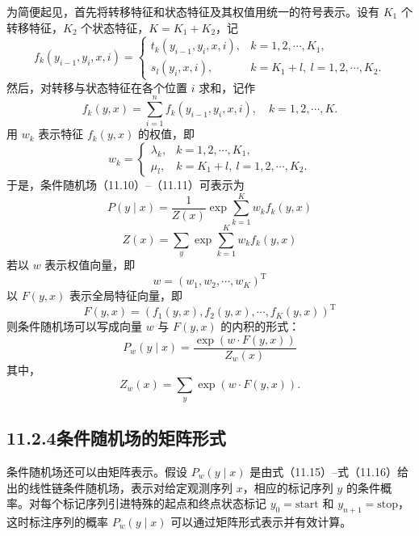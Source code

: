 \documentclass[UTF8, 12pt, fontset=fandol, oneside]{ctexart}
\begin{document}
为简便起见，首先将转移特征和状态特征及其权值用统一的符号表示。设有 $K_1$ 个转移特征，$K_2$ 个状态特征，$K=K_1+K_2$，记
\begin{equation}
f_k(y_{i-1},y_i,x,i)=
\begin{cases}
t_k(y_{i-1},y_i,x,i), & k=1,2,\cdots,K_1,\\
s_l(y_i,x,i), & k=K_1+l,\ l=1,2,\cdots,K_2.
\end{cases}
\tag{11.12}
\end{equation}
然后，对转移与状态特征在各个位置 $i$ 求和，记作
\begin{equation}
f_k(y,x)=\sum_{i=1}^{n}f_k(y_{i-1},y_i,x,i),\quad k=1,2,\cdots,K.
\tag{11.13}
\end{equation}
用 $w_k$ 表示特征 $f_k(y,x)$ 的权值，即
\begin{equation}
w_k=
\begin{cases}
\lambda_k, & k=1,2,\cdots,K_1,\\
\mu_l, & k=K_1+l,\ l=1,2,\cdots,K_2.
\end{cases}
\tag{11.14}
\end{equation}
于是，条件随机场（11.10）--（11.11）可表示为
\begin{equation}
P(y\mid x)=\frac{1}{Z(x)}\exp\sum_{k=1}^{K}w_k f_k(y,x)
\tag{11.15}
\end{equation}
\begin{equation}
Z(x)=\sum_y\exp\sum_{k=1}^{K}w_k f_k(y,x)
\tag{11.16}
\end{equation}
若以 $w$ 表示权值向量，即
\begin{equation}
w=(w_1,w_2,\cdots,w_K)^{\mathrm T}
\tag{11.17}
\end{equation}
以 $F(y,x)$ 表示全局特征向量，即
\begin{equation}
F(y,x)=(f_1(y,x),f_2(y,x),\cdots,f_K(y,x))^{\mathrm T}
\tag{11.18}
\end{equation}
则条件随机场可以写成向量 $w$ 与 $F(y,x)$ 的内积的形式：
\begin{equation}
P_w(y\mid x)=\frac{\exp(w\cdot F(y,x))}{Z_w(x)}
\tag{11.19}
\end{equation}
其中，
\begin{equation}
Z_w(x)=\sum_y\exp(w\cdot F(y,x)).
\tag{11.20}
\end{equation}

\subsection*{11.2.4\quad 条件随机场的矩阵形式}

条件随机场还可以由矩阵表示。假设 $P_w(y\mid x)$ 是由式（11.15）--式（11.16）给出的线性链条件随机场，表示对给定观测序列 $x$，相应的标记序列 $y$ 的条件概率。对每个标记序列引进特殊的起点和终点状态标记 $y_0=\text{start}$ 和 $y_{n+1}=\text{stop}$，这时标注序列的概率 $P_w(y\mid x)$ 可以通过矩阵形式表示并有效计算。
\end{document}

